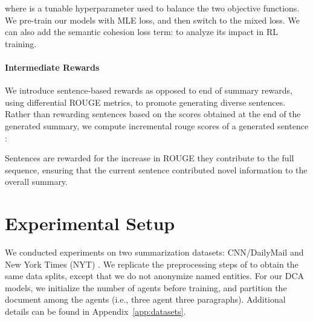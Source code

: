 \documentclass[11pt,a4paper]{article}
\begin{document}
where  is a tunable hyperparameter used to balance the two objective functions. We pre-train our models with MLE loss, and then switch to the mixed loss.
We can also add the semantic cohesion loss term:  to analyze its impact in RL training.
\paragraph{Intermediate Rewards}
We introduce sentence-based rewards as opposed to end of summary rewards, using differential ROUGE metrics, to promote generating diverse sentences. Rather than rewarding sentences based on the scores obtained at the end of the generated summary, we compute incremental rouge scores of a generated sentence :
\vspace*{-5mm}

Sentences are rewarded for the increase in ROUGE they contribute to the full sequence, ensuring that the current sentence contributed novel information to the overall summary.  \section{Experimental Setup}
\label{sec:experiments}
\label{ssec:datasets}
We conducted experiments on two summarization datasets: CNN/DailyMail \cite{summs2s,teachingmachines} and 
New York Times (NYT) \cite{nytdataset}. We replicate the preprocessing steps of \citet{rlsummsocher} to obtain the same data splits, except that we do not anonymize named entities. 
For our DCA models, we initialize the number of agents before training, 
and partition the document among the agents (i.e., three agent  three paragraphs). 
Additional details can be found in Appendix~\ref{app:datasets}.
\end{document}
